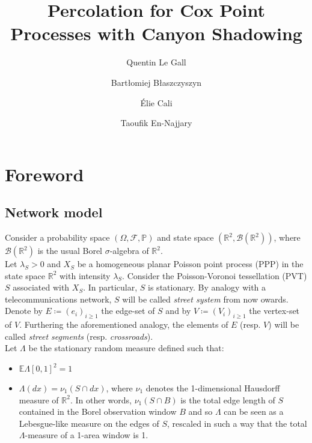 \documentclass[10pt,a4paper]{amsart}
\theoremstyle{exampstyle}
\theoremstyle{exampnotations}
\begin{document}
\title{Percolation for Cox Point Processes with Canyon Shadowing}
\author[Q. Le Gall]{Quentin Le Gall}
\address{Orange Labs Networks, 44 avenue de la République 92320 Ch\^atillon}
\author[B. B\l{}aszczyszyn] {Bart\l{}omiej B\l{}aszczyszyn}
\address{Inria - \MakeUppercase{ens}, 2 rue Simone Iff CS42112 75589 Paris Cedex 12}
\author[E. Cali]{\'Elie Cali}
\address{Orange Labs Networks, 44 avenue de la République 92320 Ch\^atillon}
\author[T. En-Najjary]{Taoufik En-Najjary}
\address{Orange Labs Networks, 44 avenue de la République 92320 Ch\^atillon}
\maketitle
\tableofcontents
\section{Foreword}
\subsection{Network model}
\label{Ss.NetworkModel}
Consider a probability space $(\Omega, \mathcal{F}, \mathbb{P})$ and state space $(\mathbb{R}^{2}, \mathcal{B}(\mathbb{R}^{2}))$, where $\mathcal{B}(\mathbb{R}^{2})$ is the usual Borel $\sigma$-algebra of $\mathbb{R}^{2}$. \\

Let $\lambda_{S} > 0$ and $X_{S}$ be a homogeneous planar Poisson point process (PPP) in the state space $\mathbb{R}^{2}$ with intensity $\lambda_S$. Consider the Poisson-Voronoi tessellation (PVT) $S$ associated with $X_S$. In particular, $S$ is stationary. By analogy with a telecommunications network, $S$ will be called \emph{street system} from now owards. \\
\indent Denote by $E \coloneqq (e_{i})_{i \geq 1}$ the edge-set of $S$ and by $V \coloneqq (V_{i})_{i \geq 1}$ the vertex-set of $V$. Furthering the aforementioned analogy, the elements of $E$ (resp. $V$) will be called \emph{street segments} (resp. \emph{crossroads}). \\
\indent Let $\Lambda$ be the stationary random measure defined such that:
\begin{itemize}
\item $\mathbb{E} \Lambda \left[0,1\right]^{2} = 1$
\item $\Lambda(dx) = \nu_{1}(S \cap dx)$, where $\nu_{1}$ denotes the 1-dimensional Hausdorff measure of $\mathbb{R}^{2}$. In other words, $\nu_{1}(S \cap B)$ is the total edge length of $S$ contained in the Borel observation window $B$ and so $\Lambda$ can be seen as a Lebesgue-like measure on the edges of $S$, rescaled in such a way that the total $\Lambda$-measure of a 1-area window is 1. \\
\end{itemize}
\end{document}
